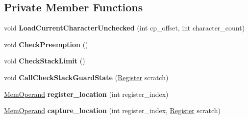 \subsection*{Private Member Functions}
\begin{DoxyCompactItemize}
\item 
void {\bfseries Load\+Current\+Character\+Unchecked} (int cp\+\_\+offset, int character\+\_\+count)\hypertarget{classv8_1_1internal_1_1_reg_exp_macro_assembler_a_r_m64_a4fe81757a3afaaef91ad9ef52b3794d7}{}\label{classv8_1_1internal_1_1_reg_exp_macro_assembler_a_r_m64_a4fe81757a3afaaef91ad9ef52b3794d7}

\item 
void {\bfseries Check\+Preemption} ()\hypertarget{classv8_1_1internal_1_1_reg_exp_macro_assembler_a_r_m64_a1678d0f16e34067114df5b7df604ba8c}{}\label{classv8_1_1internal_1_1_reg_exp_macro_assembler_a_r_m64_a1678d0f16e34067114df5b7df604ba8c}

\item 
void {\bfseries Check\+Stack\+Limit} ()\hypertarget{classv8_1_1internal_1_1_reg_exp_macro_assembler_a_r_m64_acecc3d58950498e0956f99c5093e61c9}{}\label{classv8_1_1internal_1_1_reg_exp_macro_assembler_a_r_m64_acecc3d58950498e0956f99c5093e61c9}

\item 
void {\bfseries Call\+Check\+Stack\+Guard\+State} (\hyperlink{structv8_1_1internal_1_1_register}{Register} scratch)\hypertarget{classv8_1_1internal_1_1_reg_exp_macro_assembler_a_r_m64_a489d21d7beeee54156caa19e64783b02}{}\label{classv8_1_1internal_1_1_reg_exp_macro_assembler_a_r_m64_a489d21d7beeee54156caa19e64783b02}

\item 
\hyperlink{classv8_1_1internal_1_1_mem_operand}{Mem\+Operand} {\bfseries register\+\_\+location} (int register\+\_\+index)\hypertarget{classv8_1_1internal_1_1_reg_exp_macro_assembler_a_r_m64_a47b26f8d38e756a7060f445d8e693728}{}\label{classv8_1_1internal_1_1_reg_exp_macro_assembler_a_r_m64_a47b26f8d38e756a7060f445d8e693728}

\item 
\hyperlink{classv8_1_1internal_1_1_mem_operand}{Mem\+Operand} {\bfseries capture\+\_\+location} (int register\+\_\+index, \hyperlink{structv8_1_1internal_1_1_register}{Register} scratch)\hypertarget{classv8_1_1internal_1_1_reg_exp_macro_assembler_a_r_m64_a567864d52318247c4878642d2213eb9f}{}\label{classv8_1_1internal_1_1_reg_exp_macro_assembler_a_r_m64_a567864d52318247c4878642d2213eb9f}


\end{DoxyCompactItemize}
